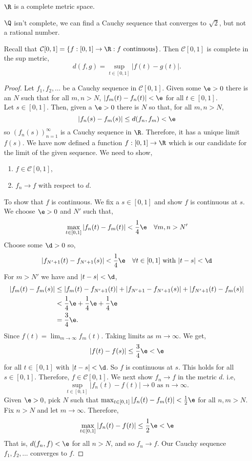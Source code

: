 \begin{eg}
  $\R$ is a complete metric space.
\end{eg}
\begin{eg}
  $\Q$ isn't complete, we can find a Cauchy sequence that converges to $\sqrt 2$, but not a rational number.
\end{eg}
\begin{eg}
  Recall that $\mathcal{C}[0, 1] = \{f : [0, 1] \to \R : f \text{ continuous}\}$. Then $\mathcal{C}[0, 1]$ is complete in the sup metric,
  $$ d(f, g) = \sup_{t \in [0, 1]} |f(t) - g(t)|. $$
\end{eg}
\begin{proof}
  Let $f_1, f_2, \dots$ be a Cauchy sequence in $\mathcal{C}[0, 1]$. Given some $\e >0$ there is an $N$ such that for all $m, n > N$, $|f_m(t) - f_n(t)| < \e$ for all $t \in [0, 1]$. \\

  \noindent
  Let $s \in [0, 1]$. Then, given a $\e > 0$ there is $N$ so that, for all $m, n> N$,
  $$|f_n(s) - f_m(s)| \le d(f_n, f_m) < \e$$
  so $(f_n(s))_{n=1}^\infty$ is a Cauchy sequence in $\R$. Therefore, it has a unique limit $f(s)$. We have now defined a function $f : [0, 1] \to \R$ which is our candidate for the limit of the given sequence. We need to show,
  \begin{enumerate}
    \item $f \in \mathcal{C}[0, 1]$,
    \item $f_n \to f$ with respect to $d$.
  \end{enumerate}
  To show that $f$ is continuous. We fix a $s \in [0, 1]$ and show $f$ is continuous at $s$. We choose $\e > 0$ and $N'$  such that,
  $$ \max_{t \in [0, 1]} |f_n(t) - f_m(t)| < \frac{1}{4}\e \quad \forall m, n > N' $$
  Choose some $\d > 0$ so,
  $$ |f_{N'+1}(t) - f_{N'+1}(s)| < \frac{1}{4}\e \quad\forall t \in [0, 1] \text{ with } |t - s|< \d $$
  For $m > N'$ we have and $|t - s| < \d$,
  \begin{align*}
    |f_m(t) - f_m(s)| &\le |f_m (t) - f_{N' + 1}(t)| + |f_{N'+1} - f_{N'+1}(s)| + |f_{N'+1}(t) - f_m(s)|\\
    &< \frac{1}{4}\e + \frac{1}{4}\e + \frac{1}{4}\e \\
    &= \frac{3}{4}\e.
  \end{align*}
  Since $f(t) = \lim_{m \to \infty} f_m(t).$ Taking limits as $m \to \infty$. We get,
  $$ |f(t) - f(s)| \le \frac{3}{4}\e < \e  $$
  for all $t \in [0, 1]$ with $|t - s| < \d$. So $f$ is continuous at $s$. This holds for all $s \in [0, 1]$. Therefore, $f \in \mathcal{C}[0, 1]$. We next show $f_n \to f$ in the metric $d$. i.e,
  $$ \sup_{t \in [0, 1]} |f_n(t) - f(t)| \to 0 \text{ as } n \to \infty. $$
  Given $\e > 0$, pick $N$ such that $\max_{t \in [0, 1]} |f_n(t) - f_m(t)| < \frac{1}{2}\e$ for all $n, m > N$. Fix $n > N$ and let $m \to \infty$. Therefore,
  $$ \max_{t \in [0, 1]} |f_n(t) - f(t)| \le \frac{1}{2}\e < \e$$
  That is, $d(f_n, f) < \e$ for all $n > N$, and so $f_n \to f$. Our Cauchy sequence $f_1, f_2, \dots$ converges to $f$.
\end{proof}

